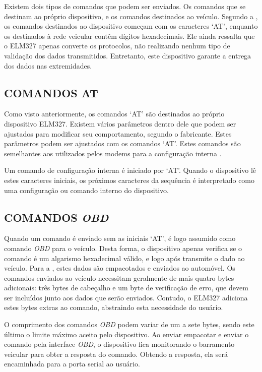Existem dois tipos de comandos que podem ser enviados. Os comandos que se destinam ao próprio dispositivo, e os comandos destinados ao veículo. Segundo a , os comandos destinados ao dispositivo começam com os caracteres ‘AT’, enquanto os destinados à rede veicular contêm dígitos hexadecimais. Ele ainda ressalta que o ELM327 apenas converte os protocolos, não realizando nenhum tipo de validação dos dados transmitidos. Entretanto, este dispositivo garante a entrega dos dados nas extremidades.

\subsection{COMANDOS AT}
Como visto anteriormente, os comandos ‘AT’ são destinados ao próprio dispositivo ELM327. Existem vários parâmetros dentro dele que podem ser ajustados para modificar seu comportamento, segundo o fabricante. Estes parâmetros podem ser ajustados com os comandos ‘AT’. Estes comandos são semelhantes aos utilizados pelos modems para a configuração interna \cite{elmeletronics}.

Um comando de configuração interna é iniciado por ‘AT’. Quando o dispositivo lê estes caracteres iniciais, os próximos caracteres da sequência é interpretado como uma configuração ou comando interno do dispositivo.

\subsection{COMANDOS \textit{OBD}}
Quando um comando é enviado sem as iniciais ‘AT’, é logo assumido como comando \textit{OBD} para o veículo. Desta forma, o dispositivo apenas verifica se o comando é um algarismo hexadecimal válido, e logo após transmite o dado ao veículo. Para a , estes dados são empacotados e enviados ao automóvel. Os comandos enviados ao veículo necessitam geralmente de mais quatro bytes adicionais: três bytes de cabeçalho e um byte de verificação de erro, que devem ser incluídos junto aos dados que serão enviados. Contudo, o ELM327 adiciona estes bytes extras ao comando, abstraindo esta necessidade do usuário.

O comprimento dos comandos \textit{OBD} podem variar de um a sete bytes, sendo este último o limite máximo aceito pelo dispositivo. Ao enviar empacotar e enviar o comando pela interface \textit{OBD}, o dispositivo fica monitorando o barramento veicular para obter a resposta do comando. Obtendo a resposta, ela será encaminhada para a porta serial ao usuário.

